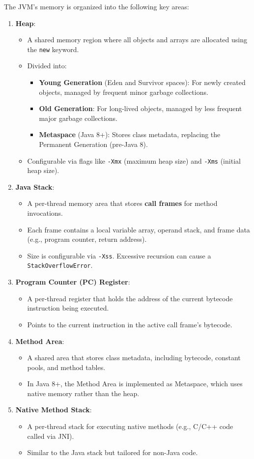\documentclass{article}
\begin{document}
The JVM's memory is organized into the following key areas:
\begin{enumerate}
	\item \textbf{Heap}:
	\begin{itemize}
		\item A shared memory region where all objects and arrays are allocated using the \texttt{new} keyword.
		\item Divided into:
		\begin{itemize}
			\item \textbf{Young Generation} (Eden and Survivor spaces): For newly created objects, managed by frequent minor garbage collections.
			\item \textbf{Old Generation}: For long-lived objects, managed by less frequent major garbage collections.
			\item \textbf{Metaspace} (Java 8+): Stores class metadata, replacing the Permanent Generation (pre-Java 8).
		\end{itemize}
		\item Configurable via flags like \texttt{-Xmx} (maximum heap size) and \texttt{-Xms} (initial heap size).
	\end{itemize}
	\item \textbf{Java Stack}:
	\begin{itemize}
		\item A per-thread memory area that stores \textbf{call frames} for method invocations.
		\item Each frame contains a local variable array, operand stack, and frame data (e.g., program counter, return address).
		\item Size is configurable via \texttt{-Xss}. Excessive recursion can cause a \texttt{StackOverflowError}.
	\end{itemize}
	\item \textbf{Program Counter (PC) Register}:
	\begin{itemize}
		\item A per-thread register that holds the address of the current bytecode instruction being executed.
		\item Points to the current instruction in the active call frame's bytecode.
	\end{itemize}
	\item \textbf{Method Area}:
	\begin{itemize}
		\item A shared area that stores class metadata, including bytecode, constant pools, and method tables.
		\item In Java 8+, the Method Area is implemented as Metaspace, which uses native memory rather than the heap.
	\end{itemize}
	\item \textbf{Native Method Stack}:
	\begin{itemize}
		\item A per-thread stack for executing native methods (e.g., C/C++ code called via JNI).
		\item Similar to the Java stack but tailored for non-Java code.
	\end{itemize}
\end{enumerate}
\end{document}
